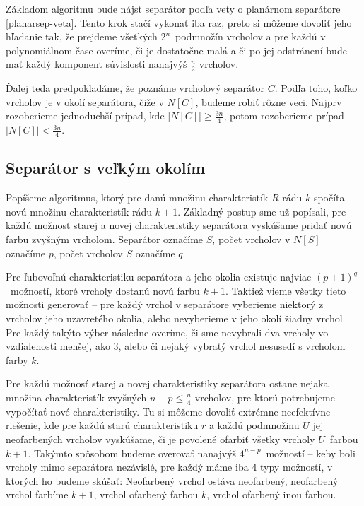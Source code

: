 Základom algoritmu bude nájsť separátor podľa vety o planárnom separátore \ref{planarsep-veta}. Tento
krok stačí vykonať iba raz, preto si môžeme dovoliť jeho hľadanie tak, že prejdeme všetkých $2^n$ podmnožín
vrcholov a pre každú v polynomiálnom čase overíme, či je dostatočne malá a či po jej odstránení bude mať
každý komponent súvislosti nanajvýš $\frac{n}{2}$ vrcholov.

Ďalej teda predpokladáme, že poznáme vrcholový separátor $C$. Podľa toho, koľko vrcholov je v okolí separátora, čiže
v $N[C]$, budeme robiť rôzne veci. Najprv rozoberieme jednoduchší prípad, kde $|N[C]| \ge \frac{3n}{4}$,
potom rozoberieme prípad $|N[C]| < \frac{3n}{4}$.

\subsection{Separátor s veľkým okolím}

Popíšeme algoritmus, ktorý pre danú množinu charakteristík $R$ rádu $k$ spočíta novú množinu charakteristík
rádu $k+1$. Základný postup sme už popísali, pre každú možnosť starej a novej charakteristiky separátora
vyskúšame pridať novú farbu zvyšným vrcholom. Separátor označíme $S$, počet vrcholov v $N[S]$ označíme $p$, počet
vrcholov $S$ označíme $q$.

Pre ľubovoľnú charakteristiku separátora a jeho okolia existuje najviac $(p+1)^q$ možností, ktoré
vrcholy dostanú novú farbu $k+1$. Taktiež vieme všetky tieto možnosti generovať -- pre každý vrchol v separátore
vyberieme niektorý z vrcholov jeho uzavretého okolia, alebo nevyberieme v jeho okolí žiadny vrchol. Pre
každý takýto výber následne overíme, či sme nevybrali dva vrcholy vo vzdialenosti menšej, ako $3$, alebo
či nejaký vybratý vrchol nesusedí s vrcholom farby $k$.

Pre každú možnosť starej a novej charakteristiky separátora ostane nejaka množina charakteristík
zvyšných $n-p \leq \frac{n}{4}$ vrcholov, pre ktorú potrebujeme vypočítať nové charakteristiky. Tu si môžeme
dovoliť extrémne neefektívne riešenie, kde pre každú starú charakteristiku $r$ a každú podmnožinu $U$
jej neofarbených vrcholov vyskúšame, či je povolené ofarbiť všetky vrcholy $U$ farbou $k+1$. Takýmto
spôsobom budeme overovať nanajvýš $4^{n-p}$ možností -- keby boli vrcholy mimo separátora nezávislé,
pre každý máme iba $4$ typy možností, v ktorých ho budeme skúšať: Neofarbený vrchol ostáva neofarbený,
neofarbený vrchol farbíme $k+1$, vrchol ofarbený farbou $k$, vrchol ofarbený inou farbou.

